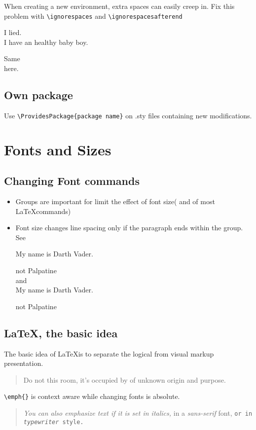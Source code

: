 \documentclass[a4paper,11pt]{article}
\begin{document}
When creating a new environment, extra spaces can easily creep
in. Fix this problem with \verb+\ignorespaces+
and \verb+\ignorespacesafterend+

\begin{correct}
  I lied.\\ I have an healthy baby boy.
\end{correct}
Same\\here.
\subsection{Own package}
Use \verb+\ProvidesPackage{package name}+
on .sty files containing new modifications.

\section{Fonts and Sizes}
\subsection{Changing Font commands}
\begin{itemize}
  \item Groups are important for limit the effect of font size(%
  and of most \LaTeX commands)
  \item Font size changes line spacing only if the paragraph
  ends within the group. See \newpage
  {\Large My name is Darth Vader.\par} not Palpatine\\
  and\\
  {\Large My name is Darth Vader.}\par not Palpatine
\end{itemize}

\subsection{\LaTeX, the basic idea}
The basic idea of \LaTeX is to separate the logical from
visual markup presentation.
\begin{quote}
  Do not  this room, it's occupied
  by  of unknown origin and purpose.
\end{quote}
\verb+\emph{}+ is context aware while changing fonts is absolute.
\begin{quote}
  \textit{You can also \emph{emphasize} text
  if it is set in italics,}
  \textsf{in a \emph{sans-serif} font,}
  \texttt{or in \emph{typewriter} style.}
\end{quote}
\end{document}
